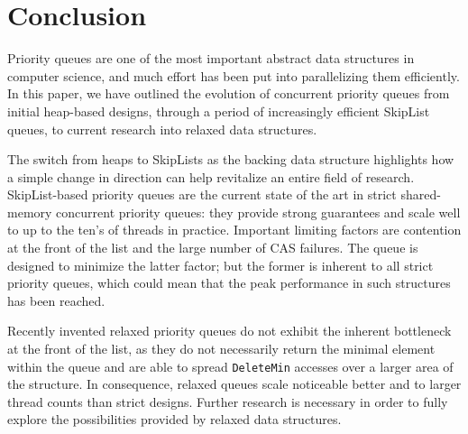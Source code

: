 \documentclass[a4paper,10pt]{article}
\begin{document}
\section{Conclusion} \label{sec:conclusion}

Priority queues are one of the most important abstract data structures in computer science,
and much effort has been put into parallelizing them efficiently. In this paper,
we have outlined the evolution of concurrent priority queues from initial heap-based designs,
through a period of increasingly efficient SkipList queues, to current research into relaxed data structures.

The switch from heaps to SkipLists as the backing data structure highlights how a simple change in
direction can help revitalize an entire field of research. SkipList-based priority queues are the current
state of the art in strict shared-memory concurrent priority queues: they provide strong guarantees
and scale well to up to the ten's of threads in practice. Important limiting factors are contention
at the front of the list and the large number of \ac{CAS} failures.
The \citeauthor{linden2013skiplist} queue is designed
to minimize the latter factor; but the former is inherent to all strict priority queues, which could mean
that the peak performance in such structures has been reached.

Recently invented relaxed priority queues do not exhibit the inherent bottleneck at the front of the list,
as they do not necessarily return the minimal element within the queue and are able to spread
\lstinline|DeleteMin| accesses over a larger area of the structure. In consequence, relaxed queues scale noticeable
better and to larger thread counts than strict designs. Further research is necessary in order to fully
explore the possibilities provided by relaxed data structures.

\begin{comment}
http://leo.stcloudstate.edu/acadwrite/conclude.html
http://writingcenter.unc.edu/handouts/conclusions/
http://www.wikihow.com/Write-a-Conclusion-for-a-Research-Paper
\end{comment}

\printbibliography
\end{document}
